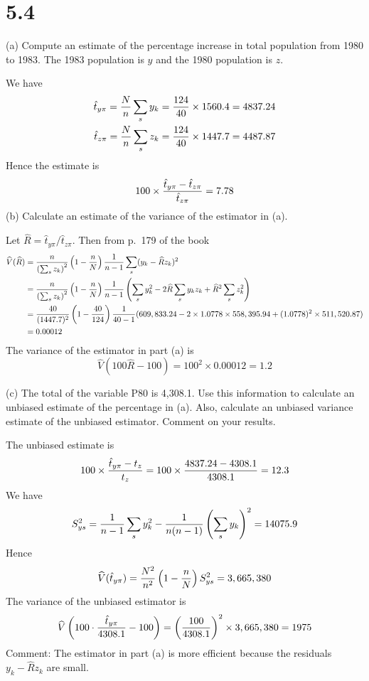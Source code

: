 \documentclass[12pt]{article}
\begin{document}

\section*{5.4}
(a) Compute an estimate of the percentage increase in total population from
1980 to 1983.
The 1983 population is $y$ and the 1980 population is $z$.

We have
\begin{align*}
\hat t_{y\pi}={N\over n}\sum_sy_k={124\over40}\times1560.4=4837.24\\
\hat t_{z\pi}={N\over n}\sum_sz_k={124\over40}\times1447.7=4487.87
\end{align*}
Hence the estimate is
\[
100\times{\hat t_{y\pi}-\hat t_{z\pi}\over\hat t_{z\pi}}=7.78
\]
(b) Calculate an estimate of the variance of the estimator in (a).

Let $\widehat R=\hat t_{y\pi}/\hat t_{z\pi}$. Then from p.\ 179 of the book
\begin{align*}
\widehat V(\widehat R)
&=
{n\over\left(\sum_sz_k\right)^2}
\left(1-{n\over N}\right){1\over n-1}
\sum_s(y_k-\widehat Rz_k)^2\\
&=
{n\over\left(\sum_sz_k\right)^2}
\left(1-{n\over N}\right){1\over n-1}
\left(\sum_sy_k^2-2\widehat R\sum_sy_kz_k+\widehat R^2\sum_sz_k^2\right)\\
&=
{40\over(1447.7)^2}
\left(1-{40\over124}\right)
{1\over40-1}
(609,833.24-2\times1.0778\times558,395.94+(1.0778)^2\times511,520.87)\\
&=0.00012
\end{align*}
The variance of the estimator in part (a) is
\[
\widehat V(100\widehat R-100)=100^2\times0.00012=1.2
\]

(c) The total of the variable P80 is 4,308.1.
Use this information to calculate an unbiased estimate of the percentage in (a).
Also, calculate an unbiased variance estimate of the unbiased estimator.
Comment on your results.

The unbiased estimate is
\[
100\times{\hat t_{y\pi}-t_z\over t_z}
=
100\times{4837.24-4308.1\over4308.1}=12.3
\]
We have
\[
S^2_{ys}={1\over n-1}\sum_sy_k^2-{1\over n(n-1)}\left(\sum_sy_k\right)^2
=14075.9
\]
Hence
\[
\widehat V(\hat t_{y\pi})={N^2\over n^2}\left(1-{n\over N}\right)S_{ys}^2
=3,665,380
\]
The variance of the unbiased estimator is
\[
\widehat V\left(100\cdot{\hat t_{y\pi}\over4308.1}-100\right)
=\left(100\over4308.1\right)^2\times3,665,380=1975
\]
Comment: The estimator in part (a) is more efficient
because the residuals $y_k-\widehat Rz_k$ are small.
\end{document}
